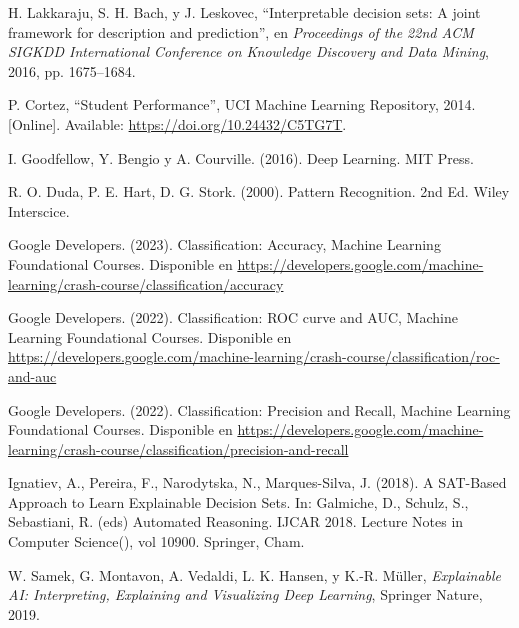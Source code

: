 \begin{thebibliography}{99}

 H. Lakkaraju, S. H. Bach, y J. Leskovec, 
``Interpretable decision sets: A joint framework for description and prediction'', en \emph{Proceedings of the 22nd ACM SIGKDD International Conference on Knowledge Discovery and Data Mining}, 2016, pp. 1675--1684.

 P. Cortez, ``Student Performance'', UCI Machine Learning Repository, 2014. [Online]. Available: \href{https://doi.org/10.24432/C5TG7T}{https://doi.org/10.24432/C5TG7T}.

 I. Goodfellow, Y. Bengio y A. Courville. (2016). Deep Learning. MIT Press.

 R. O. Duda, P. E. Hart, D. G. Stork. (2000). Pattern Recognition. 2nd Ed. Wiley Interscice. 

 Google Developers. (2023). Classification: Accuracy, Machine Learning Foundational Courses. Disponible en \href{https://developers.google.com/machine-learning/crash-course/classification/accuracy}{https://developers.google.com/machine-learning/crash-course/classification/accuracy}

 Google Developers. (2022). Classification: ROC curve and AUC, Machine Learning Foundational Courses. Disponible en \href{https://developers.google.com/machine-learning/crash-course/classification/roc-and-auc}{https://developers.google.com/machine-learning/crash-course/classification/roc-and-auc}

 Google Developers. (2022). Classification: Precision and Recall, Machine Learning Foundational Courses. Disponible en \href{https://developers.google.com/machine-learning/crash-course/classification/precision-and-recall}{https://developers.google.com/machine-learning/crash-course/classification/precision-and-recall}

 Ignatiev, A., Pereira, F., Narodytska, N., Marques-Silva, J. (2018). A SAT-Based Approach to Learn Explainable Decision Sets. In: Galmiche, D., Schulz, S., Sebastiani, R. (eds) Automated Reasoning. IJCAR 2018. Lecture Notes in Computer Science(), vol 10900. Springer, Cham.  

 W. Samek, G. Montavon, A. Vedaldi, L. K. Hansen, y K.-R. Müller, \emph{Explainable AI: Interpreting, Explaining and Visualizing Deep Learning}, Springer Nature, 2019.

\end{thebibliography}
